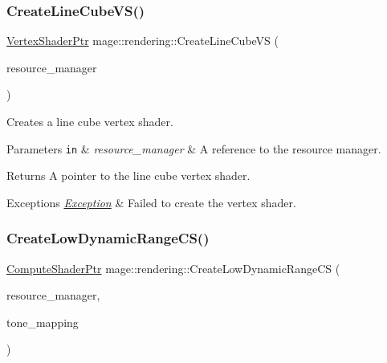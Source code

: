 \subsubsection{\texorpdfstring{Create\+Line\+Cube\+V\+S()}{CreateLineCubeVS()}}
{\footnotesize\ttfamily \mbox{\hyperlink{namespacemage_1_1rendering_aaf704b9c54a4181f4950a1761de69dda}{Vertex\+Shader\+Ptr}} mage\+::rendering\+::\+Create\+Line\+Cube\+VS (\begin{DoxyParamCaption}\item[{\mbox{\hyperlink{classmage_1_1rendering_1_1_resource_manager}{Resource\+Manager}} \&}]{resource\+\_\+manager }\end{DoxyParamCaption})}

Creates a line cube vertex shader.


\begin{DoxyParams}[1]{Parameters}
\mbox{\tt in}  & {\em resource\+\_\+manager} & A reference to the resource manager. \\
\hline
\end{DoxyParams}
\begin{DoxyReturn}{Returns}
A pointer to the line cube vertex shader. 
\end{DoxyReturn}

\begin{DoxyExceptions}{Exceptions}
{\em \mbox{\hyperlink{classmage_1_1_exception}{Exception}}} & Failed to create the vertex shader. \\
\hline
\end{DoxyExceptions}
\mbox{\label{namespacemage_1_1rendering_a81a151b15cfd41063b5e5e085ad6d6de}} 
\subsubsection{\texorpdfstring{Create\+Low\+Dynamic\+Range\+C\+S()}{CreateLowDynamicRangeCS()}}
{\footnotesize\ttfamily \mbox{\hyperlink{namespacemage_1_1rendering_ab3dc9f2114f2e9255b91d9c051da52ea}{Compute\+Shader\+Ptr}} mage\+::rendering\+::\+Create\+Low\+Dynamic\+Range\+CS (\begin{DoxyParamCaption}\item[{\mbox{\hyperlink{classmage_1_1rendering_1_1_resource_manager}{Resource\+Manager}} \&}]{resource\+\_\+manager,  }\item[{\mbox{\hyperlink{namespacemage_1_1rendering_a789e4b7d9a8cc831b065e9c6bb7430e9}{Tone\+Mapping}}}]{tone\+\_\+mapping }\end{DoxyParamCaption})}

